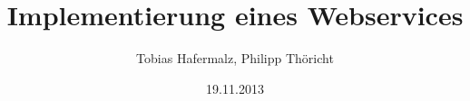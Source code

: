 \author{Tobias Hafermalz, Philipp Thöricht}
\title{Implementierung eines Webservices}
\date{19.11.2013}
\maketitle
